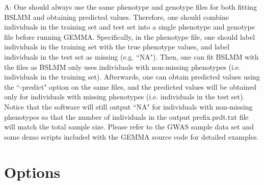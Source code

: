\documentclass[11pt]{article}
\begin{document}
A: One should always use the same phenotype and genotype files for
both fitting BSLMM and obtaining predicted values. Therefore, one
should combine individuals in the training set and test set into a
single phenotype and genotype file before running GEMMA. Specifically,
in the phenotype file, one should label individuals in the training
set with the true phenotype values, and label individuals in the test
set as missing (e.g. ``NA"). Then, one can fit BSLMM with the files as
BSLMM only uses individuals with non-missing phenotypes
(i.e. individuals in the training set). Afterwards, one can obtain
predicted values using the ``-predict" option on the same files, and
the predicted values will be obtained only for individuals with
missing phenotypes (i.e. individuals in the test set). Notice that the
software will still output ``NA" for individuals with non-missing
phenotypes so that the number of individuals in the output
prefix.prdt.txt file will match the total sample size. Please refer to
the GWAS sample data set and some demo scripts included with the GEMMA
source code for detailed examples.

\clearpage
\newpage

\section{Options}
\end{document}
